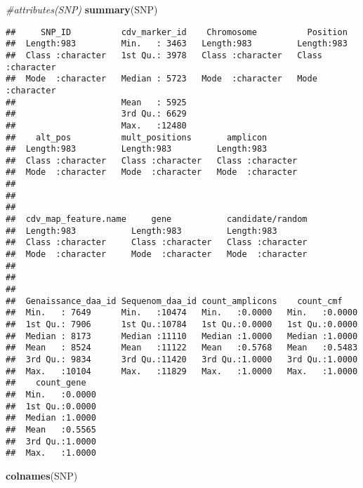 \documentclass[]{article}
\newenvironment{Shaded}{\begin{snugshade}}{\end{snugshade}}
\newcommand{\KeywordTok}[1]{\textcolor[rgb]{0.13,0.29,0.53}{\textbf{#1}}}
\newcommand{\CommentTok}[1]{\textcolor[rgb]{0.56,0.35,0.01}{\textit{#1}}}
\newcommand{\NormalTok}[1]{#1}
\begin{document}
\begin{Shaded}
\begin{Highlighting}[]
\CommentTok{#attributes(SNP)}
\KeywordTok{summary}\NormalTok{(SNP)}
\end{Highlighting}
\end{Shaded}

\begin{verbatim}
##     SNP_ID          cdv_marker_id    Chromosome          Position        
##  Length:983         Min.   : 3463   Length:983         Length:983        
##  Class :character   1st Qu.: 3978   Class :character   Class :character  
##  Mode  :character   Median : 5723   Mode  :character   Mode  :character  
##                     Mean   : 5925                                        
##                     3rd Qu.: 6629                                        
##                     Max.   :12480                                        
##    alt_pos          mult_positions       amplicon        
##  Length:983         Length:983         Length:983        
##  Class :character   Class :character   Class :character  
##  Mode  :character   Mode  :character   Mode  :character  
##                                                          
##                                                          
##                                                          
##  cdv_map_feature.name     gene           candidate/random  
##  Length:983           Length:983         Length:983        
##  Class :character     Class :character   Class :character  
##  Mode  :character     Mode  :character   Mode  :character  
##                                                            
##                                                            
##                                                            
##  Genaissance_daa_id Sequenom_daa_id count_amplicons    count_cmf     
##  Min.   : 7649      Min.   :10474   Min.   :0.0000   Min.   :0.0000  
##  1st Qu.: 7906      1st Qu.:10784   1st Qu.:0.0000   1st Qu.:0.0000  
##  Median : 8173      Median :11110   Median :1.0000   Median :1.0000  
##  Mean   : 8524      Mean   :11122   Mean   :0.5768   Mean   :0.5483  
##  3rd Qu.: 9834      3rd Qu.:11420   3rd Qu.:1.0000   3rd Qu.:1.0000  
##  Max.   :10104      Max.   :11829   Max.   :1.0000   Max.   :1.0000  
##    count_gene    
##  Min.   :0.0000  
##  1st Qu.:0.0000  
##  Median :1.0000  
##  Mean   :0.5565  
##  3rd Qu.:1.0000  
##  Max.   :1.0000
\end{verbatim}

\begin{Shaded}
\begin{Highlighting}[]
\KeywordTok{colnames}\NormalTok{(SNP)}
\end{Highlighting}
\end{Shaded}
\end{document}

